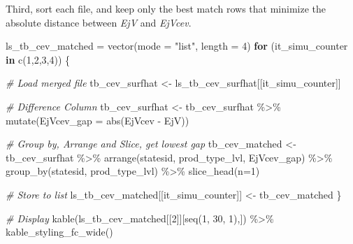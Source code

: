 \documentclass[
]{book}
\newenvironment{Shaded}{\begin{snugshade}}{\end{snugshade}}
\newcommand{\AttributeTok}[1]{\textcolor[rgb]{0.77,0.63,0.00}{#1}}
\newcommand{\CommentTok}[1]{\textcolor[rgb]{0.56,0.35,0.01}{\textit{#1}}}
\newcommand{\ControlFlowTok}[1]{\textcolor[rgb]{0.13,0.29,0.53}{\textbf{#1}}}
\newcommand{\DecValTok}[1]{\textcolor[rgb]{0.00,0.00,0.81}{#1}}
\newcommand{\FunctionTok}[1]{\textcolor[rgb]{0.00,0.00,0.00}{#1}}
\newcommand{\NormalTok}[1]{#1}
\newcommand{\OtherTok}[1]{\textcolor[rgb]{0.56,0.35,0.01}{#1}}
\newcommand{\SpecialCharTok}[1]{\textcolor[rgb]{0.00,0.00,0.00}{#1}}
\newcommand{\StringTok}[1]{\textcolor[rgb]{0.31,0.60,0.02}{#1}}
\begin{document}
Third, sort each file, and keep only the best match rows that minimize the absolute distance between \emph{EjV} and \emph{EjVcev}.

\begin{Shaded}
\begin{Highlighting}[]
\NormalTok{ls\_tb\_cev\_matched }\OtherTok{=} \FunctionTok{vector}\NormalTok{(}\AttributeTok{mode =} \StringTok{"list"}\NormalTok{, }\AttributeTok{length =} \DecValTok{4}\NormalTok{)}
\ControlFlowTok{for}\NormalTok{ (it\_simu\_counter }\ControlFlowTok{in} \FunctionTok{c}\NormalTok{(}\DecValTok{1}\NormalTok{,}\DecValTok{2}\NormalTok{,}\DecValTok{3}\NormalTok{,}\DecValTok{4}\NormalTok{)) \{}

    \CommentTok{\# Load merged file}
\NormalTok{    tb\_cev\_surfhat }\OtherTok{\textless{}{-}}\NormalTok{ ls\_tb\_cev\_surfhat[[it\_simu\_counter]]}

    \CommentTok{\# Difference Column}
\NormalTok{    tb\_cev\_surfhat }\OtherTok{\textless{}{-}}\NormalTok{ tb\_cev\_surfhat }\SpecialCharTok{\%\textgreater{}\%} 
      \FunctionTok{mutate}\NormalTok{(}\AttributeTok{EjVcev\_gap =} \FunctionTok{abs}\NormalTok{(EjVcev }\SpecialCharTok{{-}}\NormalTok{ EjV))}
    
    \CommentTok{\# Group by, Arrange and Slice, get lowest gap}
\NormalTok{    tb\_cev\_matched }\OtherTok{\textless{}{-}}\NormalTok{ tb\_cev\_surfhat }\SpecialCharTok{\%\textgreater{}\%} 
      \FunctionTok{arrange}\NormalTok{(statesid, prod\_type\_lvl, EjVcev\_gap) }\SpecialCharTok{\%\textgreater{}\%}
      \FunctionTok{group\_by}\NormalTok{(statesid, prod\_type\_lvl) }\SpecialCharTok{\%\textgreater{}\%}
      \FunctionTok{slice\_head}\NormalTok{(}\AttributeTok{n=}\DecValTok{1}\NormalTok{)}

    \CommentTok{\# Store to list}
\NormalTok{    ls\_tb\_cev\_matched[[it\_simu\_counter]] }\OtherTok{\textless{}{-}}\NormalTok{ tb\_cev\_matched}
\NormalTok{\}}

\CommentTok{\# Display}
\FunctionTok{kable}\NormalTok{(ls\_tb\_cev\_matched[[}\DecValTok{2}\NormalTok{]][}\FunctionTok{seq}\NormalTok{(}\DecValTok{1}\NormalTok{, }\DecValTok{30}\NormalTok{, }\DecValTok{1}\NormalTok{),]) }\SpecialCharTok{\%\textgreater{}\%} \FunctionTok{kable\_styling\_fc\_wide}\NormalTok{()}
\end{Highlighting}
\end{Shaded}
\end{document}
